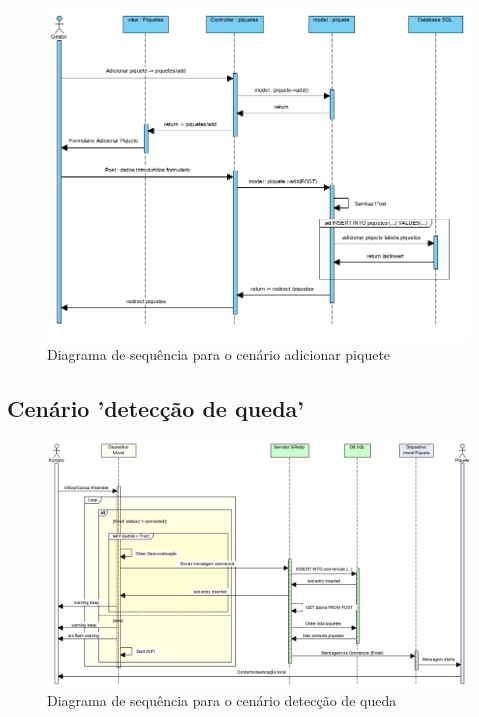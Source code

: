 \begin{figure}[!htb]
	\centering
	\includegraphics[width=\textwidth]{figuras/sequence_diagram_gestor.png}
	\caption{Diagrama de sequência para o cenário adicionar piquete}
	\label{fig:sequência_gestor}
\end{figure}

\FloatBarrier\subsection{Cenário 'detecção de queda'}

\begin{figure}[!htb]
	\centering
	\includegraphics[width=\textwidth]{figuras/sequence_diagram_system_2.png}
	\caption{Diagrama de sequência para o cenário detecção de queda}
	\label{fig:sequência_sistema}
\end{figure}

